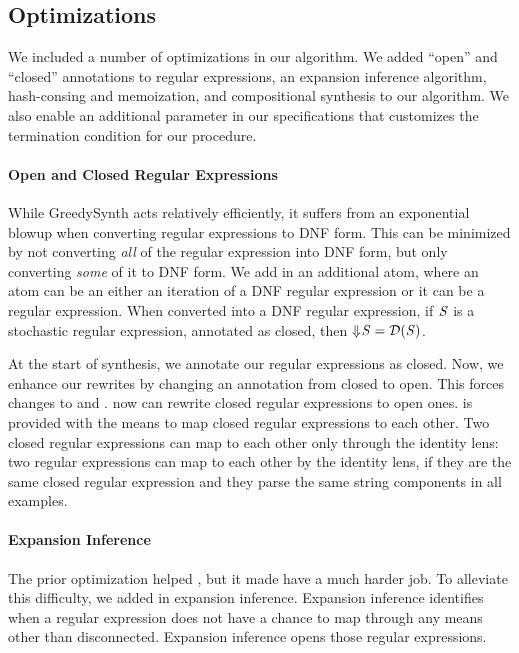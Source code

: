 \documentclass[acmsmall,screen,anonymous]{acmart}
\begin{document}
\subsection{Optimizations}

We included a number of optimizations in our algorithm. We added ``open'' and
``closed'' annotations to regular expressions, an expansion inference algorithm,
hash-consing and memoization, and compositional synthesis to our algorithm. We
also enable an additional parameter in our specifications that customizes the
termination condition for our procedure.

\paragraph*{Open and Closed Regular Expressions} While GreedySynth acts
relatively efficiently, it suffers from an exponential blowup when converting
regular expressions to DNF form. This can be minimized by not converting
\emph{all} of the regular expression into DNF form, but only converting
\emph{some} of it to DNF form. We add in an additional atom, where an atom can
be an either an iteration of a DNF regular expression or it can be a regular
expression. When converted into a DNF regular expression, if $\mathit{S}$ is a
stochastic regular expression, annotated as closed, then $\Downarrow\mkern-4mu \mathit{S}
= \mathcal{D}(\mathit{S})$.

At the start of synthesis, we annotate our regular expressions as closed. Now,
we enhance our rewrites by changing an annotation from closed to open. This
forces changes to \RXSearch and \GreedySynth. \RXSearch now can rewrite closed
regular expressions to open ones. \GreedySynth is provided with the means to map
closed regular expressions to each other. Two closed regular expressions can map
to each other only through the identity lens: two regular expressions can map to
each other by the identity lens, if they are the same closed regular expression
and they parse the same string components in all examples.

\paragraph*{Expansion Inference} The prior optimization helped \GreedySynth, but
it made \RXSearch have a much harder job.  To alleviate this difficulty, we
added in expansion inference.  Expansion inference identifies when a regular
expression does not have a chance to map through any means other than
disconnected.  Expansion inference opens those regular expressions.
\end{document}
